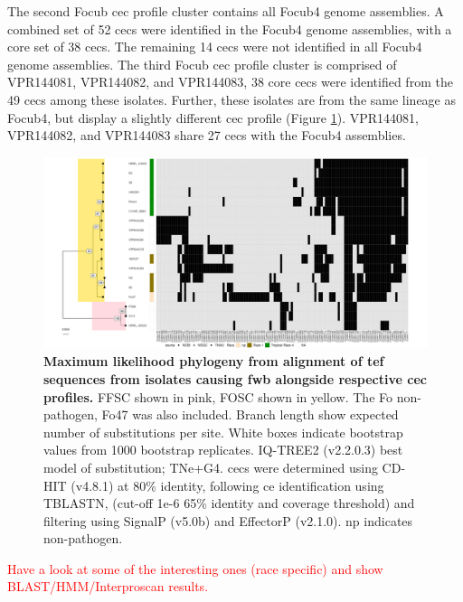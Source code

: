 The second \ac{Focub} \ac{cec} profile cluster contains all \ac{Focub4} genome assemblies. A combined set of 52 \acp{cec} were identified in the \ac{Focub4} genome assemblies, with a core set of 38 \acp{cec}. The remaining  14 \acp{cec} were not identified in all \ac{Focub4} genome assemblies. The third  \ac{Focub} \ac{cec} profile cluster is comprised of  VPR144081, VPR144082, and VPR144083, 38 core \acp{cec} were identified from the 49 \acp{cec} among these isolates. Further, these isolates are from the same lineage as \ac{Focub4}, but display a slightly different \ac{cec} profile (Figure \ref{fig:MaeiHeatmap-banana}). VPR144081, VPR144082, and VPR144083 share 27 \acp{cec} with the \ac{Focub4} assemblies. 

\begin{figure}
    \centering
    \includegraphics[width=\textwidth]{Figures/HeatmapAndPhylo_BananaPathOnly.png}
    \captionsetup{width=24cm}
    \caption[Maximum likelihood phylogeny from alignment of \Acl{tef} sequences from isolates  causing \acl{fwb} alongside respective \acl{cec} profiles.]{\textbf{Maximum likelihood phylogeny from alignment of \Acf{tef} sequences from isolates causing \acl{fwb} alongside respective \acf{cec} profiles.} \ac{FFSC} shown in pink, \ac{FOSC} shown in yellow. The \ac{Fo} non-pathogen, Fo47 was also included. Branch length show expected number of substitutions per site. White boxes indicate bootstrap values from 1000 bootstrap replicates. IQ-TREE2 (v2.2.0.3) best model of substitution; TNe+G4. \Acp{cec} were determined using CD-HIT (v4.8.1) at 80\% identity, following \ac{ce} identification using TBLASTN, (cut-off 1e-6 65\% identity and coverage threshold) and filtering using SignalP (v5.0b) and EffectorP (v2.1.0). np indicates non-pathogen.}
    \label{fig:MaeiHeatmap-banana}
\end{figure}


\textcolor{red}{Have a look at some of the interesting ones (race specific) and show BLAST/HMM/Interproscan results.}


